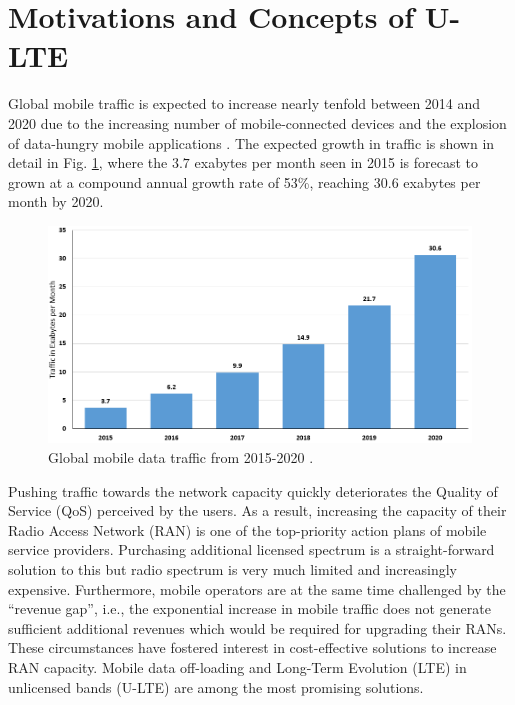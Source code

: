 \section{Motivations and Concepts of U-LTE}
\label{lte-motiv}

Global mobile traffic is expected to increase nearly tenfold between 2014 and 2020 due to the increasing number of mobile-connected devices and the explosion of data-hungry mobile applications \cite{cisco_mobile_traffic_2015}. The expected growth in traffic is shown in detail in Fig. \ref{figs:global-mobile-data-traffic-2015-2020}, where the $3.7$ exabytes per month seen in 2015 is forecast to grown at a compound annual growth rate of 53\%, reaching $30.6$ exabytes per month by 2020. 
\begin{figure}[!ht]
	\centering
	\includegraphics[width=\textwidth]{figs/global-mobile-data-traffic-2015-2020}
	\caption{Global mobile data traffic from 2015-2020 \cite{cisco_mobile_traffic_2015}.}
	\label{figs:global-mobile-data-traffic-2015-2020}
\end{figure}
Pushing traffic towards the network capacity quickly deteriorates the Quality of Service (QoS) perceived by the users. As a result, increasing the capacity of their Radio Access Network (RAN) is one of the top-priority action plans of mobile service providers. Purchasing additional licensed spectrum is a straight-forward solution to this but radio spectrum is very much limited and increasingly expensive. Furthermore, mobile operators are at the same time challenged by the ``revenue gap'', i.e., the exponential increase in mobile traffic does not generate sufficient additional revenues which would be required for upgrading their RANs. These circumstances have fostered interest in cost-effective solutions to increase RAN capacity. Mobile data off-loading and Long-Term Evolution (LTE) in unlicensed bands (\mbox{U-LTE}) are among the most promising solutions.

